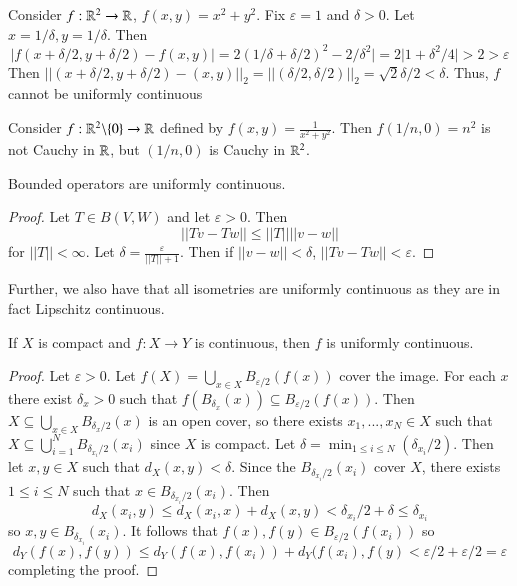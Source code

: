 \begin{example}
    Consider $f:\mathbb R^2\rightarrow \mathbb R$, $f(x,y) = x^2+y^2$. Fix $\varepsilon = 1$ and $\delta > 0$. Let $x = 1/\delta,y = 1/\delta$. Then $$|f(x+\delta/2,y+\delta/2) - f(x,y)| = 2(1/\delta + \delta/2)^2 - 2/\delta^2| = 2|1 + \delta^2/4| > 2  > \varepsilon$$ Then $||(x+\delta/2,y+\delta/2) - (x,y)||_2 = ||(\delta/2,\delta/2)||_2 = \sqrt{2}\delta/2 < \delta$. Thus, $f$ cannot be uniformly continuous
\end{example}

\begin{example}
    Consider $f:\mathbb R^2\backslash \{0\}\rightarrow \mathbb R$ defined by $f(x,y) = \frac{1}{x^2+y^2}$. Then $f(1/n,0) = n^2$ is not Cauchy in $\mathbb R$, but $(1/n,0)$ is Cauchy in $\mathbb R^2$.
\end{example}

\begin{proposition}
    Bounded operators are uniformly continuous.
\end{proposition}
\begin{proof}
    Let $T \in B(V,W)$ and let $\varepsilon > 0$. Then $$||Tv - Tw|| \leq ||T||||v-w||$$ for $||T|| < \infty$. Let $\delta = \frac{\varepsilon}{||T||+1}$. Then if $||v-w|| < \delta$, $||Tv-Tw|| < \varepsilon$.
\end{proof}

Further, we also have that all isometries are uniformly continuous as they are in fact Lipschitz continuous.

\begin{proposition}\label{prop:3.1.4}
    If $X$ is compact and $f:X\rightarrow Y$ is continuous, then $f$ is uniformly continuous.
\end{proposition}
\begin{proof}
    Let $\varepsilon >0$. Let $f(X) = \bigcup_{x \in X}B_{\varepsilon/2}(f(x))$ cover the image. For each $x$ there exist $\delta_x > 0$ such that $f(B_{\delta_x}(x)) \subseteq B_{\varepsilon/2}(f(x))$. Then $X \subseteq \bigcup_{x\in X}B_{\delta_x/2}(x)$ is an open cover, so there exists $x_1,...,x_N \in X$ such that $X \subseteq \bigcup_{i=1}^NB_{\delta_{x_i}/2}(x_i)$ since $X$ is compact. Let $\delta = \min_{1\leq i \leq N}(\delta_{x_i}/2)$. Then let $x,y \in X$ such that $d_X(x,y) < \delta$. Since the $B_{\delta_{x_i}/2}(x_i)$ cover $X$, there exists $1 \leq i \leq N$ such that $x \in B_{\delta_{x_i}/2}(x_i)$. Then $$d_X(x_i,y) \leq d_X(x_i,x) + d_X(x,y) < \delta_{x_i}/2+\delta \leq \delta_{x_i}$$ so $x,y \in B_{\delta_{x_i}}(x_i)$. It follows that $f(x),f(y) \in B_{\varepsilon/2}(f(x_i))$ so $$d_Y(f(x),f(y)) \leq d_Y(f(x),f(x_i)) + d_Y(f(x_i),f(y) < \varepsilon/2+\varepsilon/2 = \varepsilon$$
    completing the proof.
\end{proof}

